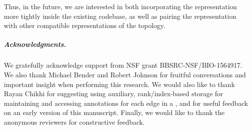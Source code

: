 
Thus, in the future, we are interested in both incorporating the \system
representation more tightly inside the existing \vari codebase, as well as
pairing the \system representation with other compatible representations of the
\dbg topology.  


\subparagraph*{Acknowledgments.}
We gratefully acknowledge support from NSF grant BBSRC-NSF/BIO-1564917. We also
thank Michael Bender and Robert Johnson for fruitful conversations and important
insight when performing this research. We would also like to thank Rayan
Chikhi for suggesting using auxiliary, rank/index-based storage for maintaining and
accessing annotations for each edge in a \dbg, and for useful feedback on an early
version of this manuscript.  Finally, we would like to thank the anonymous reviewers
for constructive feedback.



%




%
